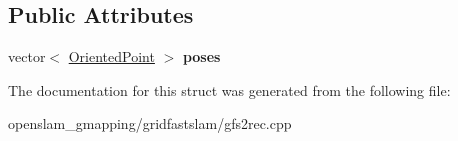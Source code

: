 \subsection*{Public Attributes}
\begin{DoxyCompactItemize}
\item 
\mbox{\label{structOdometryRecord_a0e40ab22a88731263c658c176e624544}} 
vector$<$ \hyperlink{structGMapping_1_1orientedpoint}{Oriented\+Point} $>$ {\bfseries poses}
\end{DoxyCompactItemize}


The documentation for this struct was generated from the following file\+:\begin{DoxyCompactItemize}
\item 
openslam\+\_\+gmapping/gridfastslam/gfs2rec.\+cpp\end{DoxyCompactItemize}
